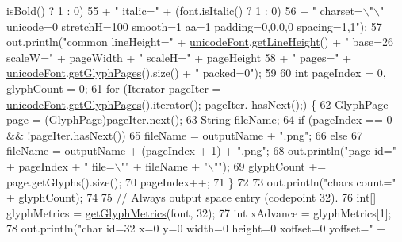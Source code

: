\begin{DoxyCode}
      isBold() ? 1 : 0)
55             + \textcolor{stringliteral}{" italic="} + (font.isItalic() ? 1 : 0)
56             + \textcolor{stringliteral}{" charset=\(\backslash\)"\(\backslash\)" unicode=0 stretchH=100 smooth=1 aa=1 padding=0,0,0,0 spacing=1,1"});
57         out.println(\textcolor{stringliteral}{"common lineHeight="} + \mbox{\hyperlink{classorg_1_1newdawn_1_1slick_1_1tools_1_1hiero_1_1_b_m_font_util_aabb529febc55852008fc0d4436186dd3}{unicodeFont}}.\mbox{\hyperlink{classorg_1_1newdawn_1_1slick_1_1_unicode_font_a4f245d11a64ccc71aa9b1d48d89cbc09}{getLineHeight}}() + \textcolor{stringliteral}{" base=26
       scaleW="} + pageWidth + \textcolor{stringliteral}{" scaleH="} + pageHeight
58             + \textcolor{stringliteral}{" pages="} + \mbox{\hyperlink{classorg_1_1newdawn_1_1slick_1_1tools_1_1hiero_1_1_b_m_font_util_aabb529febc55852008fc0d4436186dd3}{unicodeFont}}.\mbox{\hyperlink{classorg_1_1newdawn_1_1slick_1_1_unicode_font_a04594e2bc110dd31237e54caea2cfb78}{getGlyphPages}}().size() + \textcolor{stringliteral}{" packed=0"});
59 
60         \textcolor{keywordtype}{int} pageIndex = 0, glyphCount = 0;
61         \textcolor{keywordflow}{for} (Iterator pageIter = \mbox{\hyperlink{classorg_1_1newdawn_1_1slick_1_1tools_1_1hiero_1_1_b_m_font_util_aabb529febc55852008fc0d4436186dd3}{unicodeFont}}.\mbox{\hyperlink{classorg_1_1newdawn_1_1slick_1_1_unicode_font_a04594e2bc110dd31237e54caea2cfb78}{getGlyphPages}}().iterator(); pageIter.
      hasNext();) \{
62             GlyphPage page = (GlyphPage)pageIter.next();
63             String fileName;
64             \textcolor{keywordflow}{if} (pageIndex == 0 && !pageIter.hasNext())
65                 fileName = outputName + \textcolor{stringliteral}{".png"};
66             \textcolor{keywordflow}{else}
67                 fileName = outputName + (pageIndex + 1) + \textcolor{stringliteral}{".png"};
68             out.println(\textcolor{stringliteral}{"page id="} + pageIndex + \textcolor{stringliteral}{" file=\(\backslash\)""} + fileName + \textcolor{stringliteral}{"\(\backslash\)""});
69             glyphCount += page.getGlyphs().size();
70             pageIndex++;
71         \}
72 
73         out.println(\textcolor{stringliteral}{"chars count="} + glyphCount);
74 
75         \textcolor{comment}{// Always output space entry (codepoint 32).}
76         \textcolor{keywordtype}{int}[] glyphMetrics = \mbox{\hyperlink{classorg_1_1newdawn_1_1slick_1_1tools_1_1hiero_1_1_b_m_font_util_a103b65a81fd522188bc0fd1401fd13f5}{getGlyphMetrics}}(font, 32);
77         \textcolor{keywordtype}{int} xAdvance = glyphMetrics[1];
78         out.println(\textcolor{stringliteral}{"char id=32   x=0     y=0     width=0     height=0     xoffset=0     yoffset="} + 

\end{DoxyCode}
